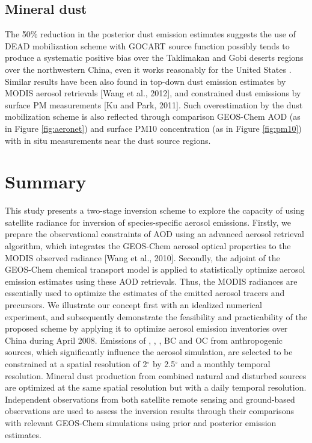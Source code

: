  \subsection{Mineral dust} 
  The \~50\% reduction in the posterior dust emission estimates suggests the use of DEAD mobilization scheme with GOCART source function possibly tends to produce a systematic positive bias over the Taklimakan and Gobi deserts regions over the northwestern China, 
even it works reasonably for the United States \citep{fairlie07}. 
Similar results have been also found in top-down dust emission estimates by MODIS aerosol retrievals [Wang et al., 2012], 
and constrained dust emissions by surface PM measurements [Ku and Park, 2011]. 
Such overestimation by the dust mobilization scheme is also reflected through comparison GEOS-Chem AOD 
(as in Figure \ref{fig:aeronet}) and surface PM10 concentration (as in Figure \ref{fig:pm10}) with in situ measurements near the dust source regions. 


\section{Summary}

 This study presents a two-stage inversion scheme to explore the capacity of using satellite radiance for inversion of species-specific aerosol emissions.
 Firstly, we prepare the observational constraints of AOD using an advanced aerosol retrieval algorithm,
 which integrates the GEOS-Chem aerosol optical properties to the MODIS observed radiance [Wang et al., 2010].
 Secondly, the adjoint of the GEOS-Chem chemical transport model is applied to statistically optimize aerosol emission estimates using these AOD retrievals.
 Thus, the MODIS radiances are essentially used to optimize the estimates of the emitted aerosol tracers and precursors.
 We illustrate our concept first with an idealized numerical experiment,
 and subsequently demonstrate the feasibility and practicability of the proposed scheme by applying it to optimize aerosol emission inventories over China during April 2008.
 Emissions of , , , BC and OC from anthropogenic sources,
 which significantly influence the aerosol simulation, are selected to be constrained at a spatial resolution of 2$^{\circ}$ by 2.5$^{\circ}$ and a monthly temporal resolution.
 Mineral dust production from combined natural and disturbed sources are optimized at the same spatial resolution but with a daily temporal resolution.
 Independent observations from both satellite remote sensing and ground-based observations are used to assess the inversion results through their comparisons with relevant GEOS-Chem simulations using prior and posterior emission estimates. 

